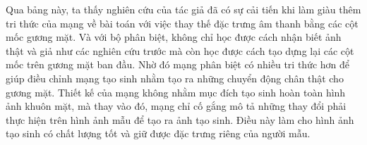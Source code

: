 Qua bảng này, ta thấy nghiên cứu của tác giả đã có sự cải tiến khi làm giàu thêm tri thức của mạng về bài toán với việc thay thế đặc trưng âm thanh bằng các cột mốc gương mặt. Và với bộ phân biệt, không chỉ học được cách nhận biết ảnh thật và giả như các nghiên cứu trước mà còn học được cách tạo dựng lại các cột mốc trên gương mặt ban đầu. Nhờ đó mạng phân biệt có nhiều tri thức hơn để giúp điều chỉnh mạng tạo sinh nhằm tạo ra những chuyển động chân thật cho gương mặt. Thiết kế của mạng không nhằm mục đích tạo sinh hoàn toàn hình ảnh khuôn mặt, mà thay vào đó, mạng chỉ cố gắng mô tả những thay đổi phải thực hiện trên hình ảnh mẫu để tạo ra ảnh tạo sinh. Điều này làm cho hình ảnh tạo sinh có chất lượng tốt và giữ được đặc trưng riêng của người mẫu.
